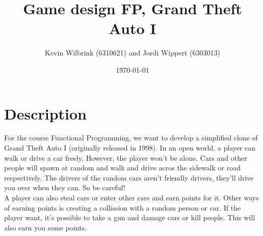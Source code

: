 \documentclass[12pt]{article}
\title{\textbf{Game design FP, Grand Theft Auto I}}
\date{\today}
\author{Kevin Wilbrink (6310621) and Jordi Wippert (6303013)}
\begin{document}
	\maketitle

	\section{Description}
	For the course Functional Programming, we want to develop a simplified clone of Grand Theft Auto I (originally released in 1998). In an open world, a player can walk or drive a car freely. However, the player won't be alone. Cars and other people will spawn at random and walk and drive acros the sidewalk or road respectively. The drivers of the random cars aren't friendly drivers, they'll drive you over when they can. So be careful!\\
	A player can also steal cars or enter other cars and earn points for it. Other ways of earning points is creating a collission with a random person or car. If the player want, it's possible to take a gun and damage cars or kill people. This will also earn you some points.
\end{document}
